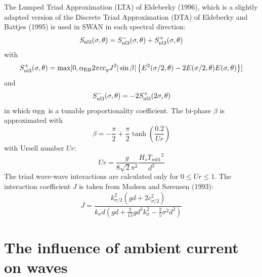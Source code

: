 \documentclass[12pt]{book}
\begin{document}
The Lumped Triad Approximation (LTA) of Eldeberky (1996), which is a slightly adapted version of the
Discrete Triad Approximation (DTA) of Eldeberky and Battjes (1995) is used in SWAN in each spectral direction:
\begin{equation}
  S_{\rm nl3} (\sigma,\theta) = S^-_{\rm nl3} (\sigma,\theta) + S^+_{\rm nl3} (\sigma,\theta)
  \label{eq3-33}
\end{equation}
with
\begin{equation}
  S^+_{\rm nl3} (\sigma,\theta) = \max [0,\alpha_{\rm EB} 2 \pi c c_g J^2 |\sin\beta| \left \{ E^2(\sigma/2,\theta) -
  2 E(\sigma/2,\theta) E(\sigma,\theta) \right \}]
  \label{eq3-34}
\end{equation}
and
\begin{equation}
  S^-_{\rm nl3} (\sigma,\theta) = -2 S^+_{\rm nl3} (2\sigma,\theta)
  \label{eq3-35}
\end{equation}
in which $\alpha _{\rm EB}$ is a tunable proportionality coefficient. The bi-phase $\beta$ is approximated with
\begin{equation}
  \beta = -\frac{\pi}{2} + \frac{\pi}{2} \tanh (\frac{0.2}{Ur})
  \label{eq3-36}
\end{equation}
with Ursell number $Ur$:
\begin{equation}
  Ur = \frac{g}{8\sqrt{2} \pi^2} \frac{H_s {T_{m01}}^2}{d^2}
  \label{eq3-37}
\end{equation}
The triad wave-wave interactions are calculated only for $0 \leq Ur \leq 1$. The interaction
coefficient $J$ is taken from Madsen and S{\o}rensen (1993):
\begin{equation}
  J = \frac{k^2_{\sigma/2} (gd + 2 c^2_{\sigma/2})}
           {k_\sigma d (gd + \frac{2}{15} gd^3 k^2_\sigma - \frac{2}{5} \sigma^2 d^2)}
  \label{eq3-38}
\end{equation}

\section{The influence of ambient current on waves} \label{sec:curre}
\end{document}

